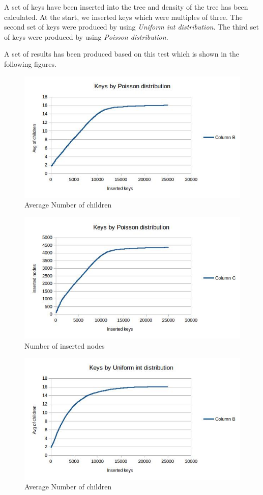 \documentclass{report}
\begin{document}
A set of keys have been inserted into the tree and density of the tree has been calculated. At the start, we inserted keys which were multiples of three. The second set of keys were produced by using \textit{Uniform int distribution}. The third set of keys were produced by using \textit{Poisson distribution}.

A set of results has been produced based on this test which is shown in the following figures.


\begin{figure}
  \includegraphics[scale=0.4]{Poissonchild}
  \caption{Average Number of children}
\end{figure}
  
\begin{figure}
  \includegraphics[scale=0.4]{Poissonnode}
  \caption{Number of inserted nodes}
\end{figure}

\begin{figure}
  \includegraphics[scale=0.4]{uniformchild}
  \caption{Average Number of children}
\end{figure}
\end{document}
